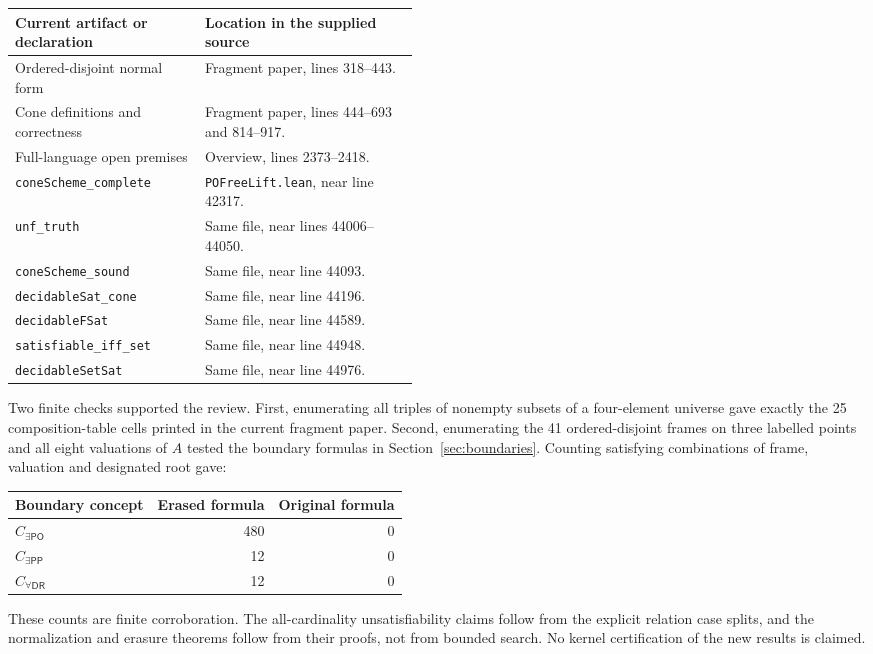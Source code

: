 \documentclass[11pt,letterpaper]{article}
\newcommand{\PP}{\mathsf{PP}}
\newcommand{\PO}{\mathsf{PO}}
\newcommand{\DR}{\mathsf{DR}}
\newcommand{\code}[1]{\texttt{#1}}
\theoremstyle{definition}
\theoremstyle{remark}
\begin{document}
\begin{center}
\small
\begin{tabularx}{\linewidth}{@{}p{0.47\linewidth}Y@{}}
\toprule
Current artifact or declaration & Location in the supplied source\\
\midrule
Ordered-disjoint normal form & Fragment paper, lines 318--443.\\
Cone definitions and correctness & Fragment paper, lines 444--693 and 814--917.\\
Full-language open premises & Overview, lines 2373--2418.\\
\code{coneScheme\_complete} & \code{POFreeLift.lean}, near line 42317.\\
\code{unf\_truth} & Same file, near lines 44006--44050.\\
\code{coneScheme\_sound} & Same file, near line 44093.\\
\code{decidableSat\_cone} & Same file, near line 44196.\\
\code{decidableFSat} & Same file, near line 44589.\\
\code{satisfiable\_iff\_set} & Same file, near line 44948.\\
\code{decidableSetSat} & Same file, near line 44976.\\
\bottomrule
\end{tabularx}
\end{center}

Two finite checks supported the review. First, enumerating all triples
of nonempty subsets of a four-element universe gave exactly the 25
composition-table cells printed in the current fragment paper. Second,
enumerating the 41 ordered-disjoint frames on three labelled points and
all eight valuations of $A$ tested the boundary formulas in
Section~\ref{sec:boundaries}. Counting satisfying combinations of frame,
valuation and designated root gave:

\begin{center}
\small
\begin{tabular}{@{}lrr@{}}
\toprule
Boundary concept & Erased formula & Original formula\\
\midrule
$C_{\exists\PO}$ & 480 & 0\\
$C_{\exists\PP}$ & 12 & 0\\
$C_{\forall\DR}$ & 12 & 0\\
\bottomrule
\end{tabular}
\end{center}

These counts are finite corroboration. The all-cardinality
unsatisfiability claims follow from the explicit relation case splits,
and the normalization and erasure theorems follow from their proofs,
not from bounded search. No kernel certification of the new results is
claimed.
\end{document}
